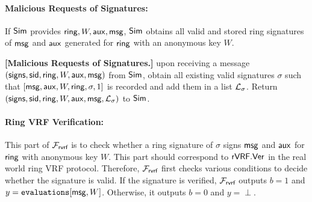 \paragraph{Malicious Requests of  Signatures:} If $ \mathsf{Sim} $ provides $ \mathsf{ring},W, \mathsf{aux}, \mathsf{msg}$, $ \mathsf{Sim} $  obtains all valid and stored ring signatures of $ \mathsf{msg} $ and $ \mathsf{aux} $ generated for $ \mathsf{ring} $ with an anonymous key $ W $.  

\begin{tcolorbox}[left=2pt,right=2pt]
	\textbf{[Malicious Requests of  Signatures.]} upon receiving a message $ (\mathsf{signs}, \textsf{sid}, \mathsf{ring}, W, \mathsf{aux},\mathsf{msg}) $ from $ \mathsf{Sim} $, obtain all existing valid signatures $ \sigma $ such that $ [\mathsf{msg}, \mathsf{aux},W,\mathsf{ring},\sigma, 1] $ is recorded and add them in a list $ {\mathcal{L}}_{\sigma} $. 	Return $ (\mathsf{signs}, \textsf{sid}, \mathsf{ring}, W,\mathsf{aux},\mathsf{msg}, {\mathcal{L}}_{\sigma})  $ to $ \mathsf{Sim} $.
\end{tcolorbox}


\paragraph{Ring VRF Verification:} This part of $ \mathcal{F}_{\textsf{rvrf}} $ is to check whether a ring signature of $ \sigma $ signs $ \mathsf{msg} $ and $ \mathsf{aux} $ for $ \mathsf{ring} $ with anonymous key $ W $. This part should correspond to $ {\mathsf{rVRF}}.{\mathsf{Ver}} $ in the real world ring VRF protocol. Therefore,
$ \mathcal{F}_{\textsf{rvrf}} $ first checks various conditions to decide whether the signature is valid. If the signature is verified, $ \mathcal{F}_{\textsf{rvrf}} $ outputs $ b = 1 $ and $ y = \texttt{evaluations}[\mathsf{msg}, W] $. Otherwise, it outputs $ b = 0 $ and $ y = \perp $. 


